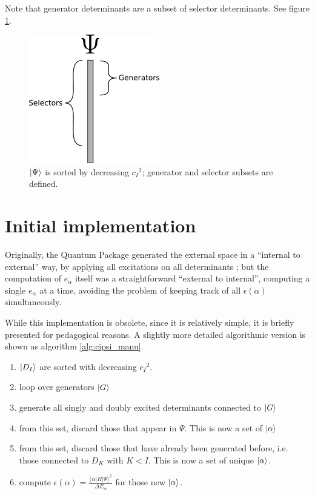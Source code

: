 \documentclass[./thesis.tex]{subfiles}
\begin{document}
Note that generator determinants are a subset of selector determinants. See figure \ref{fig:generators_selectors}.


\begin{figure}[h!]
        
        \begin{center}
                \includegraphics[width=0.4\columnwidth]{figures/cipsi/selexemple2}
                \caption{$\ket \Psi$ is sorted by decreasing ${c_I}^2$; generator and selector subsets are defined.}
                \label{fig:generators_selectors}
        \end{center}
\end{figure}



\section{Initial implementation}

Originally, the Quantum Package generated the external space in a ``internal to external'' way, by applying all excitations on all determinants ; but the computation of $e_\alpha$ itself was a straightforward ``external to internal'', computing a single $e_\alpha$ at a time, avoiding the problem of keeping track of all $\epsilon(\alpha)$ simultaneously.

While this implementation is obsolete, since it is relatively simple, it is briefly presented for pedagogical reasons. A slightly more detailed algorithmic version is shown as algorithm \ref{alg:cipsi_manu}.

\begin{enumerate}
\item
$\ket {D_I}$ are sorted with decreasing ${c_I}^2$.
\item
loop over generators $\ket G$
\item
generate all singly and doubly excited determinants connected to $\ket G$
\item
from this set, discard those that appear in $\Psi$. This is now a set of $\ket \alpha$
\item
from this set, discard those that have already been generated before, i.e. those connected to $D_K$ with $K<I$. This is now a set of unique $\ket \alpha$.
\item
compute $\epsilon(\alpha) = \frac{\langle \alpha|H|\Psi\rangle^2}{\Delta E_\alpha}$ for those new $\ket \alpha$.
\end{enumerate}
\end{document}
